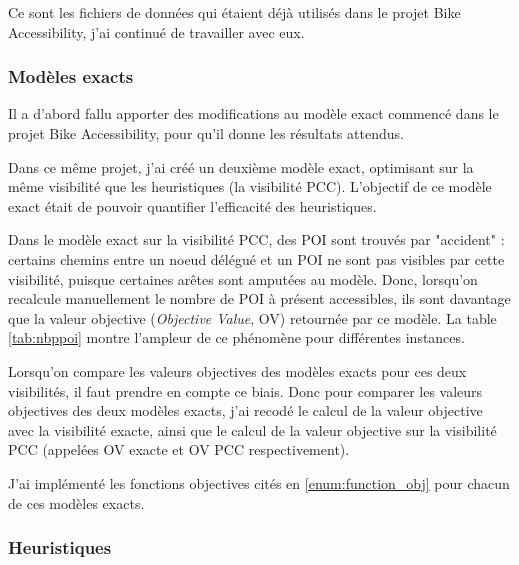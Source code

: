 Ce sont les fichiers de données qui étaient déjà utilisés dans le projet Bike Accessibility, j'ai continué de travailler avec eux. 

\subsubsection{Modèles exacts}\label{sect:prog_modelesexacts}

Il a d'abord fallu apporter des modifications au modèle exact commencé dans le projet Bike Accessibility, pour qu'il donne les résultats attendus.

Dans ce même projet, j'ai créé un deuxième modèle exact, optimisant sur la même visibilité que les heuristiques (la visibilité PCC). L'objectif de ce modèle exact était de pouvoir quantifier l'efficacité des heuristiques. 


Dans le modèle exact sur la visibilité PCC, des POI sont trouvés par "accident" : certains chemins entre un noeud délégué et un POI ne sont pas visibles par cette visibilité, puisque certaines arêtes sont amputées au modèle. Donc, lorsqu'on recalcule manuellement le nombre de POI à présent accessibles, ils sont davantage que la valeur objective (\emph{Objective Value}, OV) retournée par ce modèle. La table \ref{tab:nbppoi} montre l'ampleur de ce phénomène pour différentes instances.

Lorsqu'on compare les valeurs objectives des modèles exacts pour ces deux visibilités, il faut prendre en compte ce biais. Donc pour comparer les valeurs objectives des deux modèles exacts, j'ai recodé le calcul de la valeur objective avec la visibilité exacte, ainsi que le calcul de la valeur objective sur la visibilité PCC (appelées OV exacte et OV PCC respectivement).

J'ai implémenté les fonctions objectives cités en \ref{enum:function_obj} pour chacun de ces modèles exacts.

\subsubsection{Heuristiques}

